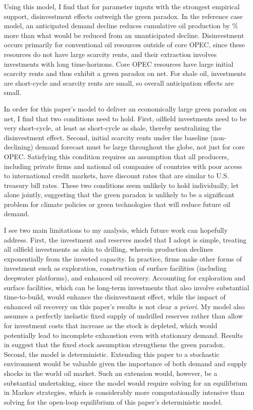 \documentclass[12pt]{article}
\begin{document}
Using this model, I find that for parameter inputs with the strongest empirical support, disinvestment effects outweigh the green paradox. In the reference case model, an anticipated demand decline reduces cumulative oil production by \unskip\% more than what would be reduced from an unanticipated decline. Disinvestment occurs primarily for conventional oil resources outside of core OPEC, since these resources do not have large scarcity rents, and their extraction involves investments with long time-horizons. Core OPEC resources have large initial scarcity rents and thus exhibit a green paradox on net. For shale oil, investments are short-cycle and scarcity rents are small, so overall anticipation effects are small.

In order for this paper's model to deliver an economically large green paradox on net, I find that two conditions need to hold. First, oilfield investments need to be very short-cycle, at least as short-cycle as shale, thereby neutralizing the disinvestment effect. Second, initial scarcity rents under the baseline (non-declining) demand forecast must be large throughout the globe, not just for core OPEC. Satisfying this condition requires an assumption that all producers, including private firms and national oil companies of countries with poor access to international credit markets, have discount rates that are similar to U.S. treasury bill rates. These two conditions seem unlikely to hold individually, let alone jointly, suggesting that the green paradox is unlikely to be a significant problem for climate policies or green technologies that will reduce future oil demand.

I see two main limitations to my analysis, which future work can hopefully address. First, the \cite{aks2018} investment and reserves model that I adopt is simple, treating all oilfield investments as akin to drilling, wherein production declines exponentially from the invested capacity. In practice, firms make other forms of investment such as exploration, construction of surface facilities (including deepwater platforms), and enhanced oil recovery. Accounting for exploration and surface facilities, which can be long-term investments that also involve substantial time-to-build, would enhance the disinvestment effect, while the impact of enhanced oil recovery on this paper's results is not clear \emph{a priori}. My model also assumes a perfectly inelastic fixed supply of undrilled reserves rather than allow for investment costs that increase as the stock is depleted, which would potentially lead to incomplete exhaustion even with stationary demand. Results in \cite{vanderPloeg2016} suggest that the fixed stock assumption strengthens the green paradox. Second, the model is deterministic. Extending this paper to a stochastic environment would be valuable given the importance of both demand and supply shocks in the world oil market. Such an extension would, however, be a substantial undertaking, since the model would require solving for an equilibrium in Markov strategies, which is considerably more computationally intensive than solving for the open-loop equilibrium of this paper's deterministic model.
\end{document}
